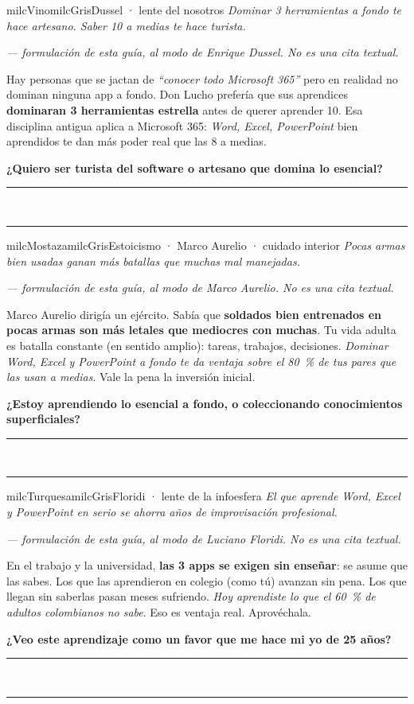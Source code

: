 \documentclass[11pt,letterpaper]{article}
\newcommand{\linead}[1]{\noindent\color{milcLinea}\rule{#1}{0.5pt}\color{milcNegro}}
\begin{document}
\begin{softbox}{milcVino}{milcGris}{Dussel · lente del nosotros}
\textit{Dominar 3 herramientas a fondo te hace artesano. Saber 10 a medias te hace turista.}

{\footnotesize\itshape\color{milcNegro!70}--- formulación de esta guía, al modo de Enrique Dussel. No es una cita textual.}

Hay personas que se jactan de \emph{``conocer todo Microsoft 365''} pero en realidad no dominan ninguna app a fondo. Don Lucho prefería que sus aprendices \textbf{dominaran 3 herramientas estrella} antes de querer aprender 10. Esa disciplina antigua aplica a Microsoft 365: \emph{Word, Excel, PowerPoint} bien aprendidos te dan más poder real que las 8 a medias.

\textbf{¿Quiero ser turista del software o artesano que domina lo esencial?}
\end{softbox}
\linead{\linewidth}\\[1mm]
\linead{\linewidth}

\begin{softbox}{milcMostaza}{milcGris}{Estoicismo · Marco Aurelio · cuidado interior}
\textit{Pocas armas bien usadas ganan más batallas que muchas mal manejadas.}

{\footnotesize\itshape\color{milcNegro!70}--- formulación de esta guía, al modo de Marco Aurelio. No es una cita textual.}

Marco Aurelio dirigía un ejército. Sabía que \textbf{soldados bien entrenados en pocas armas son más letales que mediocres con muchas}. Tu vida adulta es batalla constante (en sentido amplio): tareas, trabajos, decisiones. \emph{Dominar Word, Excel y PowerPoint a fondo te da ventaja sobre el 80~\% de tus pares que las usan a medias}. Vale la pena la inversión inicial.

\textbf{¿Estoy aprendiendo lo esencial a fondo, o coleccionando conocimientos superficiales?}
\end{softbox}
\linead{\linewidth}\\[1mm]
\linead{\linewidth}

\begin{softbox}{milcTurquesa}{milcGris}{Floridi · lente de la infoesfera}
\textit{El que aprende Word, Excel y PowerPoint en serio se ahorra años de improvisación profesional.}

{\footnotesize\itshape\color{milcNegro!70}--- formulación de esta guía, al modo de Luciano Floridi. No es una cita textual.}

En el trabajo y la universidad, \textbf{las 3 apps se exigen sin enseñar}: se asume que las sabes. Los que las aprendieron en colegio (como tú) avanzan sin pena. Los que llegan sin saberlas pasan meses sufriendo. \emph{Hoy aprendiste lo que el 60~\% de adultos colombianos no sabe}. Eso es ventaja real. Aprovéchala.

\textbf{¿Veo este aprendizaje como un favor que me hace mi yo de 25 años?}
\end{softbox}
\linead{\linewidth}\\[1mm]
\linead{\linewidth}
\end{document}
